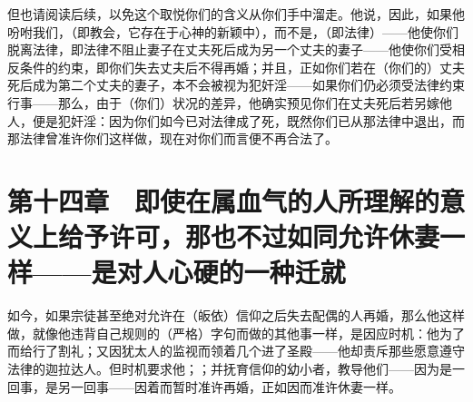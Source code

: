 但也请阅读后续，以免这个取悦你们的含义从你们手中溜走。他说，因此，如果他吩咐我们，（即教会，它存在于心神的新颖中），而不是，（即法律）——他使你们脱离法律，即法律不阻止妻子在丈夫死后成为另一个丈夫的妻子——他使你们受相反条件的约束，即你们失去丈夫后不得再婚；并且，正如你们若在（你们的）丈夫死后成为第二个丈夫的妻子，本不会被视为犯奸淫——如果你们仍必须受法律约束行事——那么，由于（你们）状况的差异，他确实预见你们在丈夫死后若另嫁他人，便是犯奸淫：因为你们如今已对法律成了死，既然你们已从那法律中退出，而那法律曾准许你们这样做，现在对你们而言便不再合法了。\par


\section{第十四章　即使在属血气的人所理解的意义上给予许可，那也不过如同允许休妻一样——是对人心硬的一种迁就}

如今，如果宗徒甚至绝对允许在（皈依）信仰之后失去配偶的人再婚，那么他这样做，就像他违背自己规则的（严格）字句而做的其他事一样，是因应时机：他为了而给行了割礼；又因犹太人的监视而领着几个进了圣殿——他却责斥那些愿意遵守法律的迦拉达人。但时机要求他；；并抚育信仰的幼小者，教导他们——因为是一回事，是另一回事——因着而暂时准许再婚，正如因而准许休妻一样。\par

